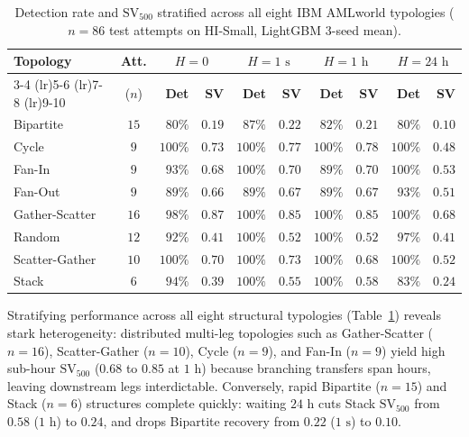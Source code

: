 \documentclass[sigconf,nonacm]{acmart}
\begin{document}
\begin{table}[t]
\centering
\caption{Detection rate and $\text{SV}_{500}$ stratified across all eight IBM AMLworld typologies ($n = 86$ test attempts on HI-Small, LightGBM 3-seed mean).}
\label{tab:typology_breakdown}
\scriptsize
\setlength{\tabcolsep}{2.8pt}
\begin{tabular}{lcrrrrrrrr}
\toprule
\textbf{Topology} & \textbf{Att.} & \multicolumn{2}{c}{\textbf{$H = 0$}} & \multicolumn{2}{c}{\textbf{$H = 1\text{ s}$}} & \multicolumn{2}{c}{\textbf{$H = 1\text{ h}$}} & \multicolumn{2}{c}{\textbf{$H = 24\text{ h}$}} \\
\cmidrule(lr){3-4} \cmidrule(lr){5-6} \cmidrule(lr){7-8} \cmidrule(lr){9-10}
 & ($n$) & \textbf{Det} & \textbf{SV} & \textbf{Det} & \textbf{SV} & \textbf{Det} & \textbf{SV} & \textbf{Det} & \textbf{SV} \\
\midrule
Bipartite & $15$ & $80\%$ & $0.19$ & $87\%$ & $0.22$ & $82\%$ & $0.21$ & $80\%$ & $0.10$ \\
Cycle & $9$ & $100\%$ & $0.73$ & $100\%$ & $0.77$ & $100\%$ & $0.78$ & $100\%$ & $0.48$ \\
Fan-In & $9$ & $93\%$ & $0.68$ & $100\%$ & $0.70$ & $89\%$ & $0.70$ & $100\%$ & $0.53$ \\
Fan-Out & $9$ & $89\%$ & $0.66$ & $89\%$ & $0.67$ & $89\%$ & $0.67$ & $93\%$ & $0.51$ \\
Gather-Scatter & $16$ & $98\%$ & $0.87$ & $100\%$ & $0.85$ & $100\%$ & $0.85$ & $100\%$ & $0.68$ \\
Random & $12$ & $92\%$ & $0.41$ & $100\%$ & $0.52$ & $100\%$ & $0.52$ & $97\%$ & $0.41$ \\
Scatter-Gather & $10$ & $100\%$ & $0.70$ & $100\%$ & $0.73$ & $100\%$ & $0.68$ & $100\%$ & $0.52$ \\
Stack & $6$ & $94\%$ & $0.39$ & $100\%$ & $0.55$ & $100\%$ & $0.58$ & $83\%$ & $0.24$ \\
\bottomrule
\end{tabular}
\end{table}

Stratifying performance across all eight structural typologies (Table~\ref{tab:typology_breakdown}) reveals stark heterogeneity: distributed multi-leg topologies such as Gather-Scatter ($n=16$), Scatter-Gather ($n=10$), Cycle ($n=9$), and Fan-In ($n=9$) yield high sub-hour $\text{SV}_{500}$ ($0.68$ to $0.85$ at $1\text{ h}$) because branching transfers span hours, leaving downstream legs interdictable. Conversely, rapid Bipartite ($n=15$) and Stack ($n=6$) structures complete quickly: waiting $24\text{ h}$ cuts Stack $\text{SV}_{500}$ from $0.58$ ($1\text{ h}$) to $0.24$, and drops Bipartite recovery from $0.22$ ($1\text{ s}$) to $0.10$.
\end{document}
